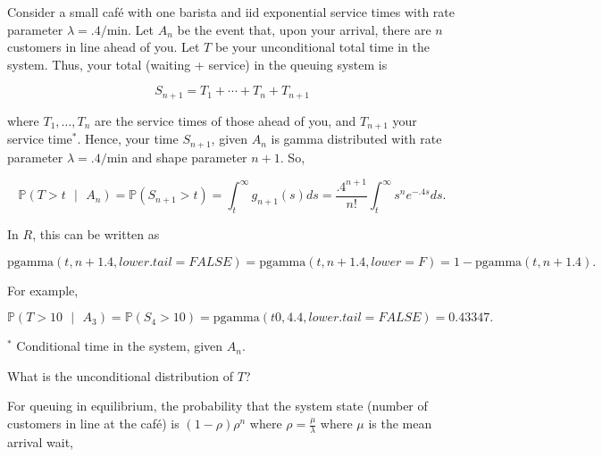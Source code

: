 \documentclass[12pt]{article}
\newcommand{\prob}[1]{\mathbb{P}(#1)}
\newcommand{\condprob}[2]{\mathbb{P}(#1 \text{ } \lvert \text{ } #2)}
\begin{document}
\begin{tcolorbox}
\noindent
Consider a small caf\'e with one barista and iid exponential service times with rate parameter $\lambda = .4/\text{min}$. Let $A_n$ be the event that, upon your arrival, there are $n$ customers in line ahead of you. Let $T$ be your unconditional total time in the system. Thus, your total (waiting + service) in the queuing system is 

\begin{equation*}
S_{n+1} = T_1 + \cdots + T_n + T_{n+1}
\end{equation*}

\noindent
where $T_1, \ldots, T_n$ are the service times of those ahead of you, and $T_{n+1}$ your service time$^*$. Hence, your time $S_{n+1}$, given $A_n$ is gamma distributed with rate parameter $\lambda = .4/\text{min}$ and shape parameter $n+1$. So, 

\begin{equation*}
\condprob{T > t}{A_n} = \prob{S_{n+1} > t} = \int_{t}^{\infty} g_{n+1}(s) ds = \frac{.4^{n+1}}{n!} \int_{t}^{\infty} s^n e^{-.4s} ds.
\end{equation*}

\noindent
In $R$, this can be written as 

\begin{equation*}
\text{pgamma}(t, n+1 .4, lower.tail=FALSE) = \text{pgamma}(t, n+1 .4, lower=F) = 1 - \text{pgamma}(t, n+1 .4) .
\end{equation*}

For example, 

\begin{equation*}
\condprob{T > 10}{A_3} = \prob{S_{4} > 10} =   \text{pgamma}(t0, 4 .4, lower.tail=FALSE) = 0.43347.
\end{equation*}

\vspace*{.5cm}
$^*$ Conditional time in the system, given $A_n$.
\end{tcolorbox}

\noindent
What is the unconditional distribution of $T$?

\noindent
For queuing in equilibrium, the probability that the system state (number of customers in line at the caf\'e) is $(1-\rho)\rho^n$ where $\rho = \frac{\mu}{\lambda}$ where $\mu$ is the mean arrival wait,
\end{document}
